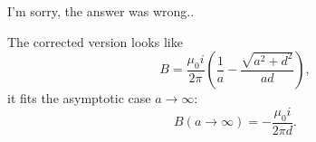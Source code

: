 \documentclass[14pt,a4paper,pdflatex]{disser}
\begin{document}

\pagebreak

I'm sorry, the answer was wrong..

The corrected version looks like
$$
  B=\frac{\mu_0 i}{2\pi}\left(\frac{1}{a}-\frac{\sqrt{a^2+d^2}}{ad}\right),
$$
it fits the asymptotic case $a\rightarrow\infty$:
$$
  B\left(a\rightarrow\infty\right)=-\frac{\mu_0 i}{2\pi d}.
$$
\end{document}
